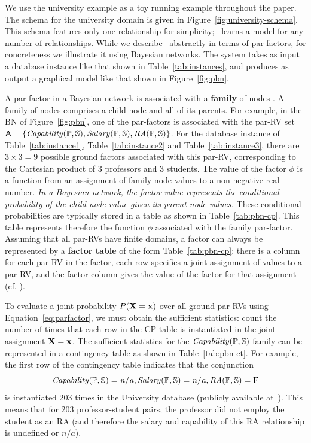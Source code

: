  We use the university example as a toy running example throughout the paper. The schema for the university domain is given in Figure~\ref{fig:university-schema}. This schema features only one relationship for simplicity; \FB\ learns a model for any number of relationships. While we describe \FB\ abstractly in terms of par-factors, for concreteness we illustrate it using Bayesian networks. The system takes as input a database instance like that shown in Table~\ref{tab:instances}, 
  and produces as output a graphical model like that shown in Figure~\ref{fig:pbn}.  


A par-factor in a Bayesian network is associated with a \textbf{family} of nodes \cite[Sec.2.2.1]{Kimmig2015}. A family of nodes comprises a child node and all of its parents. For example, in the BN of Figure~\ref{fig:pbn}, one of the par-factors is associated with the par-RV set $\parrvs=\{\it{Capability}(\P,\S),\it{Salary}(\P,\S),\it{RA}(\P,\S)\}$. For the database instance of  Table~\ref{tab:instance1}, Table~\ref{tab:instance2} and Table~\ref{tab:instance3}, there are $3\times3=9$ possible ground factors associated with this par-RV, corresponding to the Cartesian product of 3 professors and 3 students. The value of the factor $\phi$ is a function from an assignment of family node values to a non-negative real number. {\em In a Bayesian network, the factor value represents the conditional probability of the child node value given its parent node values.} These conditional probabilities are typically stored in a table as shown in Table~\ref{tab:pbn-cp}. This table represents therefore the function $\phi$ associated with the family par-factor. Assuming that all par-RVs have finite domains, a factor can always be represented by a \textbf{factor table} of the form Table~\ref{tab:pbn-cp}: there is a column for each par-RV in the factor, each row specifies a joint assignment of values to a par-RV, and the factor column gives the value of the factor for that assignment (cf. \cite[Sec.2.2.1]{Kimmig2015}).


To evaluate a joint probability $P(\set{X}=\set{x})$ over all ground par-RVs using Equation~\ref{eq:parfactor}, we must obtain the sufficient statistics: count the number of times that each row in the CP-table is instantiated in the joint assignment $\set{X}=\set{x}$. 
The sufficient statistics for the $\it{Capability}(\P,\S)$ family can be represented in a contingency table as shown in Table~\ref{tab:pbn-ct}. For example, the first row of the contingency table indicates that the conjunction $$\it{Capability}(\P,\S)=n/a,\it{Salary}(\P,\S)=n/a,\it{RA}(\P,\S) =\false$$ is instantiated 203 times in the University database (publicly available at~\cite{bib:bbsite}). This means that for 203 professor-student pairs, the professor did not employ the student as an RA (and therefore the salary and capability of this RA relationship is undefined or $n/a$).

